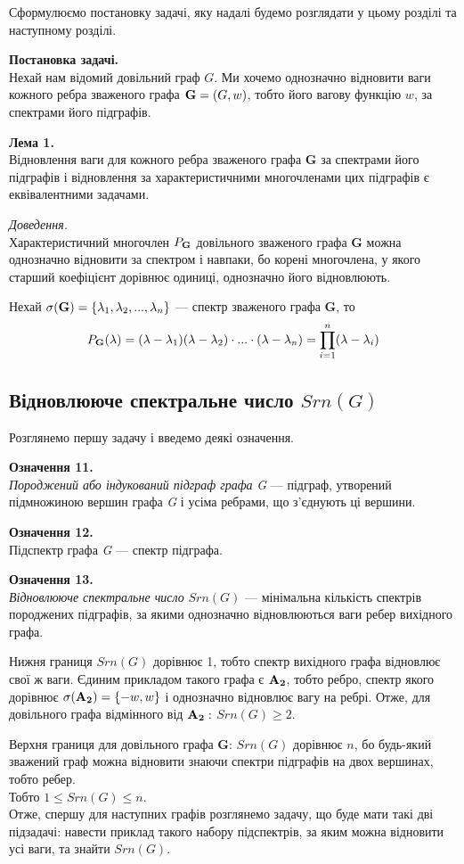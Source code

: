 Сформулюємо постановку задачі, яку надалі будемо розглядати у цьому розділі та наступному розділі.

\textbf{Постановка задачі.}\\
Нехай нам відомий довільний граф $G$. Ми хочемо однозначно відновити ваги кожного ребра зваженого графа ${\bf G} = (G,w)$, тобто його вагову функцію $w$, за спектрами його підграфів.

\textbf{Лема 1.}\\
Відновлення ваги для кожного ребра зваженого графа \textbf{G} за спектрами його підграфів і відновлення за характеристичними многочленами цих підграфів є еквівалентними задачами.

\textit{Доведення.}\\
Характеристичний многочлен $P_{\bf G}$ довільного зваженого графа \textbf{G} можна однозначно відновити за спектром і навпаки, бо корені многочлена, у якого старший коефіцієнт дорівнює одиниці, однозначно його відновлюють.

Нехай $\sigma({\bf G}) = \{\lambda_1,\lambda_2, ...,\lambda_n \}$ --- спектр зваженого графа \textbf{G}, то
\begin{equation}
    P_{\bf G}(\lambda) = (\lambda - \lambda_1)(\lambda - \lambda_2)\cdot...\cdot(\lambda - \lambda_n)= \prod_{i=1}^n(\lambda - \lambda_i)
\end{equation}

\subsection{Відновлююче спектральне число $Srn(G)$}
Розглянемо першу задачу і введемо деякі означення.

\textbf{Означення 11.}\\
\textit{Породжений або індукований підграф графа} {\it G} --- підграф, утворений підмножиною вершин графа {\it G} і усіма ребрами, що з'єднують ці вершини.

\textbf{Означення 12.}\\
{Підспектр графа \it G} --- спектр  підграфа. 

\textbf{Означення 13.}\\
\textit{Відновлююче спектральне число} $Srn({G})$ --- мінімальна кількість спектрів породжених підграфів, за якими однозначно відновлюються ваги ребер вихідного графа.

Нижня границя $Srn({G})$ дорівнює 1, тобто спектр вихідного графа відновлює свої ж ваги. Єдиним прикладом такого графа є ${\bf A_2}$, тобто ребро, спектр якого дорівнює $\sigma({\bf A_2})=\{-w,w\}$ і однозначно відновлює вагу на ребрі. Отже, для довільного графа відмінного від ${\bf A_2}:$ $Srn({G})\geq2$.

Верхня границя для довільного графа \textbf{G}: $Srn({G})$ дорівнює $n$, бо будь-який зважений граф можна відновити знаючи спектри підграфів на двох вершинах, тобто ребер.\\
Тобто $ 1 \leq Srn({G}) \leq n$.\\

Отже, спершу для наступних графів розглянемо задачу, що буде мати такі дві підзадачі: навести приклад такого набору підспектрів, за яким можна відновити усі ваги, та знайти $Srn({G})$.
